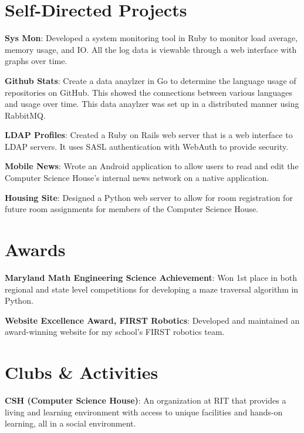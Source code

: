 \documentclass[a4paper,margin,line]{resume}
\begin{document}
\begin{resume}
\section{\mysidestyle Self-Directed Projects}
    \begin{asparablank}
        \item \textbf{Sys Mon}: Developed a system monitoring tool in Ruby to monitor 
            load average, memory usage, and IO. All the log 
            data is viewable through a web interface with graphs over time. \\
        \item \textbf{Github Stats}: Create a data anaylzer in Go to determine the language
            usage of repositories on GitHub. This showed the connections between
            various languages and usage over time. This data anaylzer was set up in a
            distributed manner using RabbitMQ. \\
        \item \textbf{LDAP Profiles}: Created a Ruby on Rails web server that is a web 
            interface to LDAP servers. It uses SASL authentication with WebAuth 
            to provide security. \\
        \item \textbf{Mobile News}: Wrote an Android application to allow users to read 
            and edit the Computer Science House’s internal news network on a 
            native application. \\
        \item \textbf{Housing Site}: Designed a Python web server to allow for room 
            registration for future room assignments for members of the Computer
            Science House.
    \end{asparablank}
\section{\mysidestyle Awards}
    \begin{asparablank}
        \item \textbf{Maryland Math Engineering Science Achievement}: Won 1st place
            in both regional and state level competitions for developing a maze
            traversal algorithm in Python. \\
        \item \textbf{Website Excellence Award, FIRST Robotics}: Developed and maintained an
            award-winning website for my school's FIRST robotics team.
    \end{asparablank}
\section{\mysidestyle Clubs \& Activities}
    \begin{asparablank}
        \item \textbf{CSH (Computer Science House)}: An organization at RIT that 
            provides a living and learning environment with access to unique facilities
            and hands-on learning, all in a social environment.
    \end{asparablank}
\end{resume}
\end{document}
